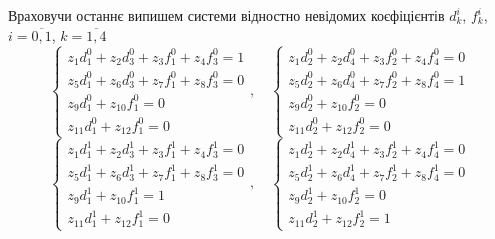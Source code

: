 Враховучи останнє випишем системи відностно невідомих коєфіцієнтів $d_k^i$, $f_k^i$, $i=\overline{0,1}$, $k=\overline{1,4}$
\begin{equation*}
    \begin{cases}
        z_1 d_1^0 + z_2 d_3^0 + z_3 f_1^0 + z_4 f_3^0 = 1 \\
        z_5 d_1^0 + z_6 d_3^0 + z_7 f_1^0 + z_8 f_3^0 = 0 \\
        z_9 d_1^0 + z_{10} f_1^0 = 0 \\
        z_{11} d_1^0 + z_{12} f_1^0 = 0
    \end{cases}, \quad
    \begin{cases}
        z_1 d_2^0 + z_2 d_4^0 + z_3 f_2^0 + z_4 f_4^0 = 0 \\
        z_5 d_2^0 + z_6 d_4^0 + z_7 f_2^0 + z_8 f_4^0 = 1 \\
        z_9 d_2^0 + z_{10} f_2^0 = 0 \\
        z_{11} d_2^0 + z_{12} f_2^0 = 0
    \end{cases}
\end{equation*}
\begin{equation*}
    \begin{cases}
        z_1 d_1^1 + z_2 d_3^1 + z_3 f_1^1 + z_4 f_3^1 = 0 \\
        z_5 d_1^1 + z_6 d_3^1 + z_7 f_1^1 + z_8 f_3^1 = 0 \\
        z_9 d_1^1 + z_{10} f_1^1 = 1 \\
        z_{11} d_1^1 + z_{12} f_1^1 = 0
    \end{cases}, \quad
    \begin{cases}
        z_1 d_2^1 + z_2 d_4^1 + z_3 f_2^1 + z_4 f_4^1 = 0 \\
        z_5 d_2^1 + z_6 d_4^1 + z_7 f_2^1 + z_8 f_4^1 = 0 \\
        z_9 d_2^1 + z_{10} f_2^1 = 0 \\
        z_{11} d_2^1 + z_{12} f_2^1 = 1
    \end{cases}
\end{equation*}